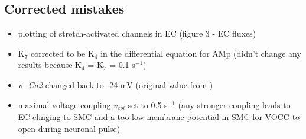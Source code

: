 \subsection{Corrected mistakes}
\begin{itemize}
\item plotting of stretch-activated channels in EC (figure 3 - EC fluxes)
\item K$_{7}$ corrected to be K$_{4}$ in the differential equation for AMp (didn't change any results because K$_{4}$ = K$_{7}$ = 0.1 s$ ^{-1} $)
\item \textit{v\_Ca2} changed back to -24 mV (original value from \cite{Koenigsberger2005})
\item maximal voltage coupling $v_{cpl}$ set to 0.5 s$^{-1}$ (any stronger coupling leads to EC clinging to SMC and a too low membrane potential in SMC for VOCC to open during neuronal pulse)
\end{itemize}


 
 

